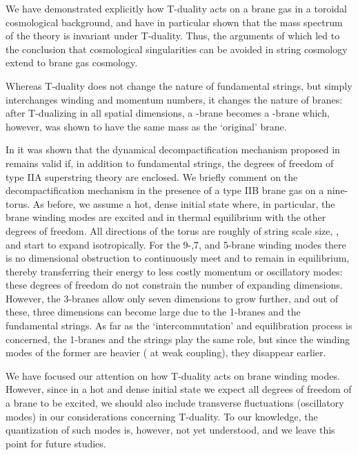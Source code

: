 \documentclass[a4paper,twocolumn,nofootinbib,tightenlines,prd,aps,
               superscriptaddress]{revtex4} %
\providecommand{\al}{\alpha}
\begin{document}
We have demonstrated explicitly how T-duality acts on a brane gas
in a toroidal cosmological background, and have in particular
shown that the mass spectrum of the theory is invariant under
T-duality. Thus, the arguments of \cite{Brandenberger:1989aj}
which led to the conclusion that cosmological singularities can be
avoided in string cosmology extend to brane gas cosmology.

Whereas T-duality does not change the nature of fundamental
strings, but simply interchanges winding and momentum numbers, it
changes the nature of branes: after T-dualizing in all \coordHE{} spatial
dimensions, a \coordHE{}-brane becomes a \coordHE{}-brane which, however,
was shown to have the same mass as the `original' brane.

In \cite{Alexander:2000xv} it was shown that the dynamical
decompactification mechanism proposed in
\cite{Brandenberger:1989aj} remains valid if, in addition to
fundamental strings, the degrees of freedom of type IIA
superstring theory are enclosed. We briefly comment on the
decompactification mechanism in the presence of a type IIB brane
gas on a nine-torus. As before, we assume a hot, dense initial
state where, in particular, the brane winding modes are excited
and in thermal equilibrium with the other degrees of freedom. All
directions of the torus are roughly of string scale size, \coordHE{},
and start to expand isotropically. For the 9-,7, and 5-brane
winding modes there is no dimensional obstruction to continuously
meet and to remain in equilibrium, thereby transferring their
energy to less costly momentum or oscillatory modes: these degrees
of freedom do not constrain the number of expanding dimensions.
However, the 3-branes allow only seven dimensions to grow further,
and out of these, three dimensions can become large due to the
1-branes and the fundamental strings. As far as the
`intercommutation' and equilibration process is concerned, the
1-branes and the strings play the same role, but since the winding
modes of the former are heavier (\myHighlight{$\frac{R}{g\al'} \gg
\frac{R}{\al'}$}\coordHE{} at weak coupling), they disappear earlier.

We have focused our attention on how T-duality acts on brane
winding modes. However, since in a hot and dense initial state we
expect all degrees of freedom of a brane to be excited, we should
also include transverse fluctuations (oscillatory modes) in our
considerations concerning T-duality. To our knowledge, the
quantization of such modes is, however, not yet understood, and we
leave this point for future studies.
\end{document}
